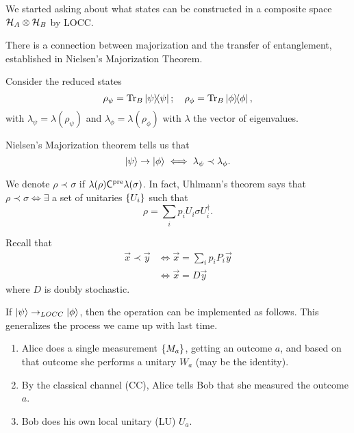 We started asking about what states can be constructed in a composite space $\mathcal H_A \otimes \mathcal H_B$ by LOCC.

There is a connection between majorization and the transfer of entanglement, established in Nielsen's Majorization Theorem.

Consider the reduced states
\begin{equation}
    \rho_\psi =\operatorname{Tr}_B \left\lvert{\psi}\middle\rangle\!\middle\langle{\psi}\right\rvert; \quad \rho_\phi = \operatorname{Tr}_B \left\lvert{\phi}\middle\rangle\!\middle\langle{\phi}\right\rvert,
\end{equation}
with $\lambda_\psi=\lambda(\rho_\psi)$ and $\lambda_\phi=\lambda(\rho_\phi)$ with $\lambda$ the vector of eigenvalues.

Nielsen's Majorization theorem tells us that
\begin{equation}
    \lvert\psi\rangle\to \lvert\phi\rangle \iff \lambda_\psi \prec \lambda_\phi.
\end{equation}

We denote $\rho \prec \sigma$ if $\lambda(\rho)\mathsf C^{\text{pre}} \lambda (\sigma)$. In fact, Uhlmann's theorem says that $\rho \prec\sigma \iff \exists$ a set of unitaries $\{U_i\}$ such that
\begin{equation}
    \rho=\sum_i p_i U_i \sigma U_i^\dagger.
\end{equation}

Recall that
\begin{align}
    \vec x \prec \vec y &\iff \vec x = \sum_i p_i P_i \vec y \\
    &\iff \vec x =D\vec y
\end{align}
where $D$ is doubly stochastic.

If $\lvert\psi\rangle\to_{LOCC} \lvert\phi\rangle$, then the operation can be implemented as follows. This generalizes the process we came up with last time.
\begin{enumerate}
    \item Alice does a single measurement $\{M_a\}$, getting an outcome $a$, and based on that outcome she performs a unitary $W_a$ (may be the identity).
    \item By the classical channel (CC), Alice tells Bob that she measured the outcome $a$.
    \item Bob does his own local unitary (LU) $U_a$.
\end{enumerate}

